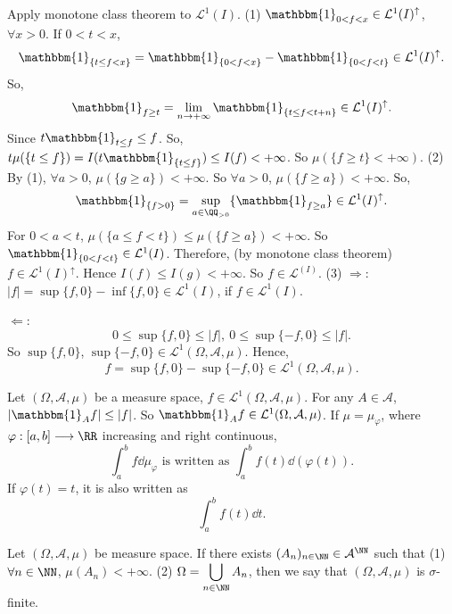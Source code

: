 \begin{proofenv}
    Apply monotone class theorem to $\mathcal{L}^1(I)$.
    \newline
    (1) $\mathbbm{1}_{0< f<x}\in\mathcal{L}^1(I)^\uparrow$, $\forall x>0$. If $0<t<x$,
    $$ \mathbbm{1}_{\{t\le f<x\}}=\mathbbm{1}_{\{0<f<x\}}-\mathbbm{1}_{\{0<f<t\}}\in \mathcal{L}^1(I)^\uparrow.$$
    So, 
    $$ \mathbbm{1}_{f\ge t}=\lim_{n\rightarrow+\infty} \mathbbm{1}_{\{t\le f<t+n\}}\in \mathcal{L}^1(I)^\uparrow.$$
    Since $t\mathbbm{1}_{t\le f}\le f$.
    So, $t \mu(\{t\le f\})=I(t \mathbbm{1}_{\{t\le f\}})\le I(f)<+\infty$. So $\mu(\{f\ge t\}<+\infty)$.
    \newline
    (2) By (1), $\forall a>0$, $\mu(\{g\ge a\})<+\infty$. So $\forall a>0$, $\mu(\{f\ge a\})<+\infty$.
    So,
    $$ \mathbbm{1}_{\{f>0\}}=\sup_{a\in \QQ_{>0}}\{\mathbbm{1}_{f\ge a}\}\in \mathcal{L}^1(I)^\uparrow.$$
    For $0<a<t$, $\mu(\{a\le f<t\})\le \mu(\{f\ge a\})<+\infty$.
    So $\mathbbm{1}_{\{0<f<t\}}\in \mathcal{L}^1(I)$. 
    Therefore, (by monotone class theorem) $f\in \mathcal{L}^1(I)^\uparrow$.
    Hence $I(f)\le I(g)<+\infty$. So $f\in \mathcal{L}^(I)$.
    \newline
    (3) $\Rightarrow$: $|f|=\sup\{f,0\} - \inf\{f,0\}\in \mathcal{L}^1(I)$, if $f\in \mathcal{L}^1(I)$.

    $\Leftarrow$: $$ 0\le \sup\{f,0\}\le |f|,\ 0\le \sup\{-f,0\}\le |f|.$$
    So $\sup\{f,0\}$, $\sup\{-f,0\}\in \mathcal{L}^1(\Omega,\mathcal{A},\mu).$
    Hence, 
    $$ f=\sup\{f,0\}-\sup\{-f,0\}\in \mathcal{L}^{1}(\Omega,\mathcal{A},\mu).$$


\end{proofenv}
\begin{notationenv}
    Let $(\Omega,\mathcal{A},\mu)$ be a measure space, $f\in \mathcal{L}^1(\Omega,\mathcal{A},\mu)$. For any $A\in \mathcal{A}$, $|\mathbbm{1}_{A} f|\le |f|$.
    So $\mathbbm{1}_{A}f\in \mathcal{L}^1(\Omega,\mathcal{A},\mu)$. If $\mu=\mu_{\varphi}$, where $\varphi:[a,b]\longrightarrow \RR$  increasing and right continuous,
    $$ \int_{a}^{b} f \dd\mu_{\varphi} \text{ is written as } \int_{a}^{b} f(t)\dd(\varphi(t)).$$
    If $\varphi(t)=t$, it is also written as 
    $$ \int_{a}^{b} f(t) \dd t.$$
\end{notationenv}
\begin{definitionenv}
    Let $(\Omega,\mathcal{A},\mu)$ be measure space. If there exists $(A_n)_{n\in \NN}\in \mathcal{A}^\NN$ such that
    \newline
    (1) $\forall n\in \NN$, $\mu(A_n)<+\infty$.
    \newline
    (2) $\displaystyle\Omega=\bigcup_{n\in \NN}A_n$, then we say that $(\Omega,\mathcal{A}, \mu)$ is $\sigma$-finite.
\end{definitionenv}
